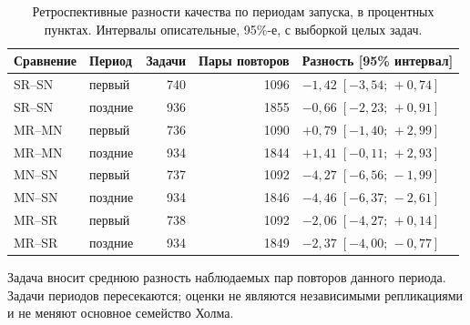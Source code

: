 \begin{table}[t]
\caption{Ретроспективные разности качества по периодам запуска, в процентных пунктах. Интервалы описательные, 95\%-е, с выборкой целых задач.}
\label{tab:temporal-diagnostics}
\centering\small
\begin{tabular}{@{}llrrl@{}}\toprule
Сравнение & Период & Задачи & Пары повторов & Разность [95\% интервал]\\
\midrule
SR--SN & первый & 740 & 1096 & $-1{,}42\;[-3{,}54;\,+0{,}74]$\\
SR--SN & поздние & 936 & 1855 & $-0{,}66\;[-2{,}23;\,+0{,}91]$\\
MR--MN & первый & 736 & 1090 & $+0{,}79\;[-1{,}40;\,+2{,}99]$\\
MR--MN & поздние & 934 & 1844 & $+1{,}41\;[-0{,}11;\,+2{,}93]$\\
MN--SN & первый & 737 & 1092 & $-4{,}27\;[-6{,}56;\,-1{,}99]$\\
MN--SN & поздние & 934 & 1846 & $-4{,}46\;[-6{,}37;\,-2{,}61]$\\
MR--SR & первый & 738 & 1092 & $-2{,}06\;[-4{,}27;\,+0{,}14]$\\
MR--SR & поздние & 934 & 1849 & $-2{,}37\;[-4{,}00;\,-0{,}77]$\\
\bottomrule\end{tabular}
\par\smallskip\noindent Задача вносит среднюю разность наблюдаемых пар повторов данного периода. Задачи периодов пересекаются; оценки не являются независимыми репликациями и не меняют основное семейство Холма.
\end{table}
